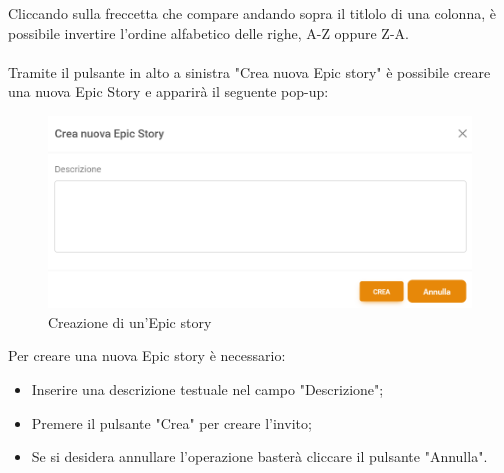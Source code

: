\documentclass{article}
\begin{document}
Cliccando sulla freccetta che compare andando sopra il titlolo di una colonna, è possibile invertire l'ordine alfabetico delle righe, A-Z oppure Z-A.\\\\
Tramite il pulsante in alto a sinistra "Crea nuova Epic story" è possibile creare una nuova Epic Story e apparirà il seguente pop-up:
    \begin{figure}[H]
      \centering
      \includegraphics[width=\textwidth]{documenti/Screenshot manuale utente/creazione epic story.png}
      \caption{Creazione di un'Epic story}
      \label{creaepic}
    \end{figure} 
Per creare una nuova Epic story è necessario:
\begin{itemize}
    \item Inserire una descrizione testuale nel campo "Descrizione";
    \item Premere il pulsante "Crea" per creare l'invito;
    \item Se si desidera annullare l'operazione basterà cliccare il pulsante "Annulla".
\end{itemize}
\end{document}

